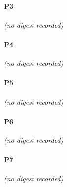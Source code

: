 \documentclass[11pt,a4paper]{article}
\begin{document}
\paragraph*{P3}
\emph{(no digest recorded)}
\paragraph*{P4}
\emph{(no digest recorded)}
\paragraph*{P5}
\emph{(no digest recorded)}
\paragraph*{P6}
\emph{(no digest recorded)}
\paragraph*{P7}
\emph{(no digest recorded)}
\end{document}
